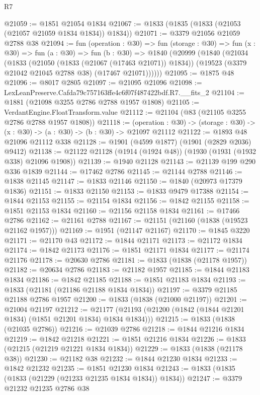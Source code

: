 \begin{lexlean}{R7}
\begin{coremodule}
@21059 := @1851 @21054 @1834
@21067 := @1833 (@1835 (@1833 (@21053 (@21057 @21059 @1834 @1834)) @1834))
@21071 := @3379 @21056 @21059 @2788 @38
@21094 := fun (operation : @30) =>
  fun (storage : @30) =>
  fun (x : @30) =>
  fun (a : @30) =>
  fun (b : @30) =>
  @1840
    (@20999
      (@1840
        (@21034
          (@1833
            (@21050 (@1833 (@21067 (@17463 @21071)) @1834))
            (@19523 (@3379 @21042 @21045 @2788 @38) (@17467 @21071))))))
@21095 := @1875 @48
@21096 := @8017 @2805
@21097 := @21095 @21096
@21098 := LexLeanPreserve.Cafda79c757163ffe4c6f07f487422bdf.R7.__fits_2
@21104 := @1881 (@21098 @3255 @2786 @2788 @1957 @1808)
@21105 := VerdantEngine.FloatTransform.value
@21112 := @21104 (@83 (@21105 @3255 @2786 @2788 @1957 @1808))
@21118 := (operation : @30) ->
  (storage : @30) -> (x : @30) -> (a : @30) -> (b : @30) -> @21097 @21112
@21122 := @1893 @48 @21096 @21112 @338
@21128 := @1901 (@4599 @1877) (@1901 (@2829 @2036) @9412)
@21138 := @21122 @21128 (@1914 (@1924 @48)) (@1930 (@1931 (@1932 @338) @21096 @1908))
@21139 := @1940 @21128
@21143 := @21139 @199 @290 @336 @1839
@21144 := @17462 @2786
@21145 := @21144 @2788
@21146 := @1838 @21145
@21147 := @1833 @21146
@21150 := @1840 (@20973 @17379 @1836)
@21151 := @1833 @21150
@21153 := @1833 @9479 @17388
@21154 := @1844 @21153
@21155 := @21154 @1834
@21156 := @1842 @21155
@21158 := @1851 @21153 @1834
@21160 := @21156 @21158 @1834
@21161 := @17466 @2786
@21162 := @21161 @2788
@21167 := @21151 (@21160 (@1838 (@19523 @21162 @1957)))
@21169 := @1951 (@21147 @21167)
@21170 := @1845 @3220
@21171 := @21170 @43
@21172 := @1844 @21171
@21173 := @21172 @1834
@21174 := @1842 @21173
@21176 := @1851 @21171 @1834
@21177 := @21174 @21176
@21178 := @20630 @2786
@21181 := @1833 (@1838 (@21178 @1957))
@21182 := @20634 @2786
@21183 := @21182 @1957
@21185 := @1844 @21183 @1834
@21186 := @1842 @21185
@21188 := @1851 @21183 @1834
@21193 := @1833 (@21181 (@21186 @21188 @1834 @1834))
@21197 := @3379 @21185 @21188 @2786 @1957
@21200 := @1833 (@1838 (@21000 @21197))
@21201 := @21004 @21197
@21212 := @21177 (@21193 (@21200 (@1842 (@1844 @21201 @1834) (@1851 @21201 @1834) @1834 @1834)))
@21215 := @1833 (@1838 (@21035 @2786))
@21216 := @21039 @2786
@21218 := @1844 @21216 @1834
@21219 := @1842 @21218
@21221 := @1851 @21216 @1834
@21226 := @1833 (@21215 (@21219 @21221 @1834 @1834))
@21229 := @1833 (@1838 (@21178 @38))
@21230 := @21182 @38
@21232 := @1844 @21230 @1834
@21233 := @1842 @21232
@21235 := @1851 @21230 @1834
@21243 := @1833 (@1835 (@1833 (@21229 (@21233 @21235 @1834 @1834)) @1834))
@21247 := @3379 @21232 @21235 @2786 @38

\end{coremodule}
\end{lexlean}

